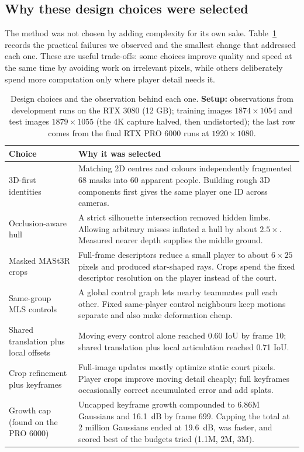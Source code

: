 \documentclass[11pt]{article}
\begin{document}
\subsection{Why these design choices were selected}
The method was not chosen by adding complexity for its own sake. Table~\ref{tab:choices} records
the practical failures we observed and the smallest change that addressed each one. These are useful
trade-offs: some choices improve quality and speed at the same time by avoiding work on irrelevant
pixels, while others deliberately spend more computation only where player detail needs it.
\begin{table}[!htbp]\centering
\caption{Design choices and the observation behind each one. \textbf{Setup:} observations from development runs on the RTX 3080 (12 GB); training images $1874\times1054$ and test images $1879\times1055$ (the 4K capture halved, then undistorted); the last row comes from the final RTX PRO 6000 runs at $1920\times1080$.}\label{tab:choices}
\small\begin{tabular}{p{.31\linewidth}p{.61\linewidth}}\toprule
Choice & Why it was selected \\\midrule
3D-first identities & Matching 2D centres and colours independently fragmented 68 masks into 60 apparent people. Building rough 3D components first gives the same player one ID across cameras. \\
Occlusion-aware hull & A strict silhouette intersection removed hidden limbs. Allowing arbitrary misses inflated a hull by about $2.5\times$. Measured nearer depth supplies the middle ground. \\
Masked MASt3R crops & Full-frame descriptors reduce a small player to about $6\times25$ pixels and produced star-shaped rays. Crops spend the fixed descriptor resolution on the player instead of the court. \\
Same-group MLS controls & A global control graph lets nearby teammates pull each other. Fixed same-player control neighbours keep motions separate and also make deformation cheap. \\
Shared translation plus local offsets & Moving every control alone reached 0.60 IoU by frame 10; shared translation plus local articulation reached 0.71 IoU. \\
Crop refinement plus keyframes & Full-image updates mostly optimize static court pixels. Player crops improve moving detail cheaply; full keyframes occasionally correct accumulated error and add splats. \\
Growth cap (found on the PRO 6000) & Uncapped keyframe growth compounded to 6.86M Gaussians and 16.1~dB by frame 699. Capping the total at 2 million Gaussians ended at 19.6~dB, was faster, and scored best of the budgets tried (1.1M, 2M, 3M). \\\bottomrule
\end{tabular}\end{table}
\end{document}
